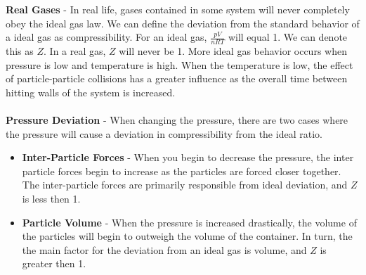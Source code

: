 \documentclass{article}
\begin{document}
	\vspace{10pt}
	\noindent\textbf{Real Gases} - In real life, gases contained in some system will never completely obey the ideal gas law. We can define the deviation from the standard behavior of a ideal gas as compressibility. For an ideal gas, $\frac{pV}{nRT}$ will equal 1. We can denote this as $Z$. In a real gas, $Z$ will never be 1. More ideal gas behavior occurs when pressure is low and temperature is high. When the temperature is low, the effect of particle-particle collisions has a greater influence as the overall time between hitting walls of the system is increased.\\
	\\
	\textbf{Pressure Deviation} - When changing the pressure, there are two cases where the pressure will cause a deviation in compressibility from the ideal ratio.\\
	\begin{itemize}
		\item \textbf{Inter-Particle Forces} - When you begin to decrease the pressure, the inter particle forces begin to increase as the particles are forced closer together. The inter-particle forces are primarily responsible from ideal deviation, and $Z$ is less then 1.
		\item \textbf{Particle Volume} - When the pressure is increased drastically, the volume of the particles will begin to outweigh the volume of the container. In turn, the the main factor for the deviation from an ideal gas is volume, and $Z$ is greater then 1.
	\end{itemize}
	
\end{document}
